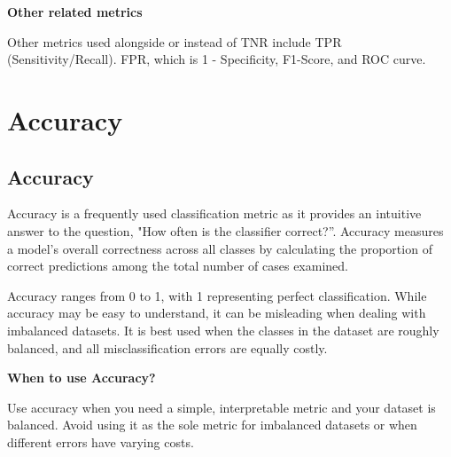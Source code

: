 \textbf{Other related metrics}

Other metrics used alongside or instead of TNR include TPR (Sensitivity/Recall). FPR, which is 1 - Specificity, F1-Score, and ROC curve.

\clearpage

\thispagestyle{classificationstyle}
\section{Accuracy}
\subsection{Accuracy} 

Accuracy is a frequently used classification metric as it provides an intuitive answer to the question, "How often is the classifier correct?”.
Accuracy measures a model's overall correctness across all classes by calculating the proportion of correct predictions among the total number of cases examined.

\begin{center}
\end{center}

Accuracy ranges from 0 to 1, with 1 representing perfect classification. While accuracy may be easy to understand, it can be misleading when dealing with imbalanced datasets.
It is best used when the classes in the dataset are roughly balanced, and all misclassification errors are equally costly.

\textbf{When to use Accuracy?}

Use accuracy when you need a simple, interpretable metric and your dataset is balanced. Avoid using it as the sole metric for imbalanced datasets or when different errors have varying costs.

